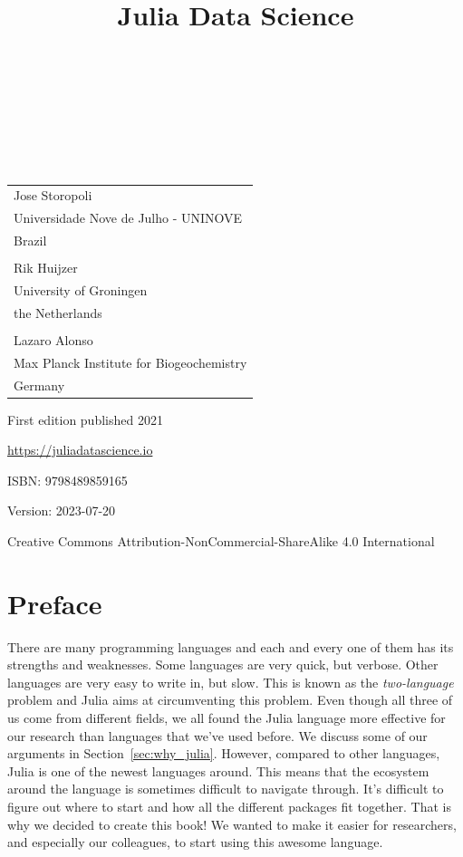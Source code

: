 \documentclass[
  notoc %
]{tufte-book}
\title{Julia Data Science}
\author{\noindent{Jose Storopoli}\\[3mm] \noindent{Rik
Huijzer}\\[3mm] \noindent{Lazaro Alonso}\\[3mm] }
\date{}
\begin{document}
\makeatletter
\thispagestyle{empty}
\vfill
{\Huge\bf
\noindent
\@title
}\\[1in]
{\Large
\noindent
\@author
}
\makeatother

\makeatletter
\newpage
\thispagestyle{empty}
\vfill
{\noindent
\begin{tabular}{l} Jose Storopoli\\ Universidade Nove de Julho - UNINOVE\\ Brazil\\ \\ Rik Huijzer\\ University of Groningen\\ the Netherlands\\ \\ Lazaro Alonso\\ Max Planck Institute for Biogeochemistry\\ Germany \end{tabular}
}
\vfill
{\small
First edition published 2021

\url{https://juliadatascience.io}

ISBN: 9798489859165

Version: 2023-07-20

Creative Commons Attribution-NonCommercial-ShareAlike 4.0 International
}
\makeatother


\frontmatter
\mainmatter

\setcounter{tocdepth}{1}
\tableofcontents

\justifying

\setlength{\parindent}{0pt}

\hypertarget{sec:preface}{%
\chapter{Preface}\label{sec:preface}}

There are many programming languages and each and every one of them has
its strengths and weaknesses. Some languages are very quick, but
verbose. Other languages are very easy to write in, but slow. This is
known as the \emph{two-language} problem and Julia aims at circumventing
this problem. Even though all three of us come from different fields, we
all found the Julia language more effective for our research than
languages that we've used before. We discuss some of our arguments in
Section~\ref{sec:why_julia}. However, compared to other languages, Julia
is one of the newest languages around. This means that the ecosystem
around the language is sometimes difficult to navigate through. It's
difficult to figure out where to start and how all the different
packages fit together. That is why we decided to create this book! We
wanted to make it easier for researchers, and especially our colleagues,
to start using this awesome language.
\end{document}
